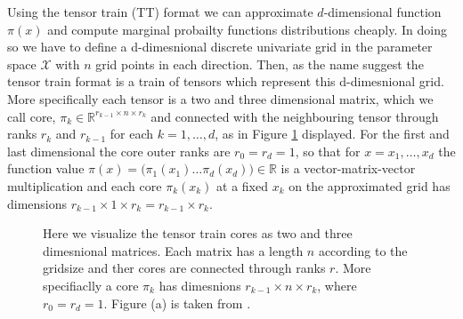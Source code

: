 Using the tensor train (TT) format we can approximate $d$-dimensional function $\pi(x)$ and compute marginal probailty functions distributions cheaply.
In doing so we have to define a d-dimesnional discrete univariate grid in the parameter space $\mathcal{X}$ with $n$ grid points in each direction.
Then, as the name suggest the tensor train format is a train of tensors which represent this d-dimesnional grid.
More specifically each tensor is a two and three dimensional matrix, which we call core, $\pi_{k} \in \mathbb{R}^{r_{k-1} \times n \times r_{k}}$ and connected with the neighbouring tensor through ranks $r_{k}$ and $r_{k-1}$ for each $k = 1, \dots , d$, as in Figure \ref{fig:TTfig} displayed.
For the first and last dimensional the core outer ranks are $r_0  = r_d = 1$, so that for $x = {x_1, \dots, x_d}$ the function value $\pi(x) = \big( \pi_1(x_1) \dots \pi_d(x_d) \big)\in \mathbb{R}$ is a vector-matrix-vector multiplication and each core $\pi_k(x_k)$ at a fixed $x_k$ on the approximated grid has dimensions $r_{k-1} \times 1 \times r_{k} =r_{k-1} \times r_{k}$.


\begin{figure}[ht!]
	\centering
\begin{subfigure}{\textwidth}
	
	\caption{}
\end{subfigure}
	\centering
\begin{subfigure}{\textwidth}
	\caption{}
\end{subfigure}
\caption[Visualization of Tensor Train cores]{Here we visualize the tensor train cores as two and three dimesnional matrices. Each matrix has a length $n$ according to the gridsize and ther cores are connected through ranks $r$. More specifiaclly a core $\pi_k$ has dimesnions $r_{k-1} \times  n \times r_k$, where $r_0 = r_d = 1$. Figure (a) is taken from \cite{fox2021grid}.}
\label{fig:TTfig}
\end{figure}


